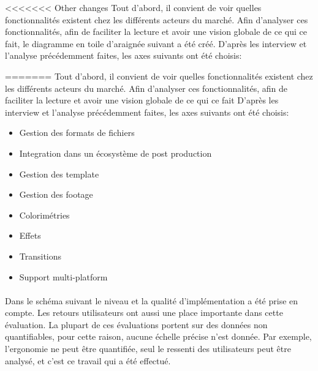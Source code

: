 <<<<<<< Other changes
Tout d'abord, il convient de voir quelles fonctionnalités existent chez
les différents acteurs du marché. Afin d'analyser ces fonctionnalités,
afin de faciliter la lecture et avoir une vision globale de ce qui
ce fait, le diagramme en toile d'araignée suivant a été créé.
D'après les interview et l'analyse précédemment faites, les axes
suivants ont été choisis: \begin{itemize} \setlength{\itemsep}{2mm}
=======
Tout d'abord, il convient de voir quelles fonctionnalités
existent chez les différents acteurs du marché. Afin d'analyser ces
fonctionnalités, afin de faciliter la lecture et avoir une vision
globale de ce qui ce fait%
D'après les interview et l'analyse précédemment
faites, les axes suivants ont été choisis:
\begin{itemize} \setlength{\itemsep}{2mm}
>>>>>>> Your changes
  \item{Gestion des formats de fichiers} \item{Integration dans
  un écosystème de post production} \item{Gestion des template}
  \item{Gestion des footage} \item{Colorimétries} \item{Effets}
  \item{Transitions} \item{Support multi-platform}
\end {itemize}

\paragraph{} Dans le schéma suivant le niveau et la qualité
d'implémentation a été prise en compte. Les retours utilisateurs
ont aussi une place importante dans cette évaluation. La plupart de
ces évaluations portent sur des données non quantifiables, pour cette
raison, aucune échelle précise n'est donnée.  Par exemple, l'ergonomie
ne peut être quantifiée, seul le ressenti des utilisateurs peut être
analysé, et c'est ce travail qui a été effectué.

\begin{figure} [H]

  \begin{center}


\end{center}
\end{figure}
\end{itemize}
